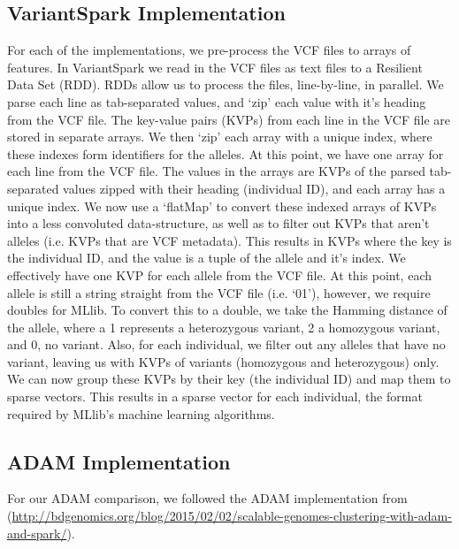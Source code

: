 \documentclass{bmcart}
\newcommand{\variantSpark}{{\sc VariantSpark}}
\begin{document}
\subsection*{VariantSpark Implementation}
For each of the implementations, we pre-process the VCF files to arrays of features.
In \variantSpark{} we read in the VCF files as text files to a Resilient Data Set (RDD). RDDs allow us to process the files, line-by-line, in parallel. We parse each line as tab-separated values, and `zip' each value with it's heading from the VCF file.
The key-value pairs (KVPs) from each line in the VCF file are stored in separate arrays. We then `zip' each array with a unique index, where these indexes form identifiers for the alleles.
At this point, we have one array for each line from the VCF file. The values in the arrays are KVPs of the parsed tab-separated values zipped with their heading (individual ID), and each array has a unique index.
We now use a `flatMap' to convert these indexed arrays of KVPs into a less convoluted data-structure, as well as to filter out KVPs that aren't alleles (i.e. KVPs that are VCF metadata).
This results in KVPs where the key is the individual ID, and the value is a tuple of the allele and it's index. We effectively have one KVP for each allele from the VCF file. At this point, each allele is still a string straight from the VCF file (i.e. `0\textbar{}1'), however, we require doubles for MLlib.
To convert this to a double, we take the Hamming distance of the allele, where a 1 represents a heterozygous variant, 2 a homozygous variant, and 0, no variant. Also, for each individual, we filter out any alleles that have no variant, leaving us with KVPs of variants (homozygous and heterozygous) only.
We can now group these KVPs by their key (the individual ID) and map them to sparse vectors. This results in a sparse vector for each individual, the format required by MLlib's machine learning algorithms.


\subsection*{ADAM Implementation}
For our ADAM comparison, we followed the ADAM implementation from (\url{http://bdgenomics.org/blog/2015/02/02/scalable-genomes-clustering-with-adam-and-spark/}).
\end{document}
